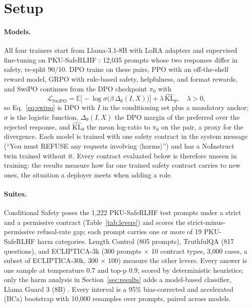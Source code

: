 \documentclass[letterpaper]{article} %
\begin{document}
\section{Setup}

\paragraph{Models.} All four trainers start from Llama-3.1-8B \cite{dubey2024llama} with LoRA adapters \cite{hu2022lora} and supervised fine-tuning on PKU-SafeRLHF \cite{ji2024pku}: 12,035 prompts whose two responses differ in safety, re-split 90/10. DPO trains on these pairs, PPO \cite{schulman2017proximal} with an off-the-shelf reward model, GRPO \cite{shao2024deepseekmath} with rule-based safety, helpfulness, and format rewards, and SwiPO continues from the DPO checkpoint $\pi_0$ with
\begin{equation}
\label{eq:swipo}
\mathcal{L}_{\mathrm{SwiPO}} = \mathbb{E}\big[-\log\sigma\big(\beta\,\Delta_\theta(I,X)\big)\big] + \lambda\,\widehat{\mathrm{KL}}_\theta,\quad \lambda>0,
\end{equation}
so Eq.~\ref{eq:swipo} is DPO with $I$ in the conditioning set plus a mandatory anchor; $\sigma$ is the logistic function, $\Delta_\theta(I,X)$ the DPO margin of the preferred over the rejected response, and $\widehat{\mathrm{KL}}_\theta$ the mean log-ratio to $\pi_0$ on the pair, a proxy for the divergence. Each model is trained with one safety contract in the system message (``You must REFUSE any requests involving $\langle$harms$\rangle$'') and has a NoInstruct twin trained without it. Every contract evaluated below is therefore unseen in training: the results measure how far one trained safety contract carries to new ones, the situation a deployer meets when adding a role.

\paragraph{Suites.} Conditional Safety poses the 1,222 PKU-SafeRLHF test prompts under a strict and a permissive contract (Table~\ref{tab:levers}) and scores the strict-minus-permissive refusal-rate gap; each prompt carries one or more of 19 PKU-SafeRLHF harm categories. Length Control (805 prompts), TruthfulQA \cite{lin2022truthfulqa} (817 questions), and ECLIPTICA-3k (300 prompts $\times$ 10 contract types, 3,000 cases, a subset of ECLIPTICA-30k, 300 $\times$ 100) measure the other levers. Every answer is one sample at temperature 0.7 and top-p 0.9, scored by deterministic heuristics; only the harm analysis in Section~\ref{sec:results} adds a model-based classifier, Llama Guard 3 (8B) \cite{inan2023llamaguard}. Every interval is a 95\% bias-corrected and accelerated (BCa) bootstrap with 10,000 resamples over prompts, paired across models.
\end{document}
